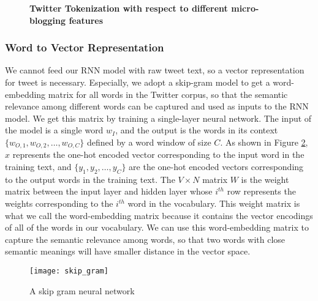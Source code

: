 \begin{figure}[ht]
\begin{minipage}[t]{1\linewidth}
\centering 
{} 
\caption{\textbf{Twitter Tokenization with respect to different micro-blogging features}}
\label{fig:token}
\end{minipage}
\end{figure}


\subsubsection {Word to Vector Representation}
We cannot feed our RNN model with raw tweet text, so a vector representation for tweet is necessary.
%
Especially, we adopt a skip-gram model to get a word-embedding matrix for all words in the Twitter corpus\cite{mikolov2013efficient}, so that the semantic relevance  among different words can be captured and used as inputs to the RNN model.
%
We get this matrix by training a single-layer neural network. 
%
 The input of the model is a single word $w_I$, and the output is the words in its context $\{w_{O,1},w_{O,2}, \dots, w_{O,C}\}$ defined by a word window of size $C$.
%
As shown in Figure \ref{fig:skip_gram},  $x$ represents the one-hot encoded vector corresponding to the
input word in the training text,
%
 and $\{y_1, y_2, \dots, y_C\}$ are the one-hot encoded vectors corresponding to the output words in the training text.
 The $V \times N$ matrix $W$ is the weight matrix between the input layer and hidden layer whose
$i^{th}$ row represents the weights corresponding to the $i^{th}$ word in the vocabulary. 
%
This weight matrix is what we call the word-embedding matrix because it contains the
vector encodings of all of the words in our vocabulary.
%
We can use this word-embedding matrix to capture the semantic relevance among words, so that two words with close semantic meanings will have smaller distance in the vector space.

\begin{figure}[htb]
	\centering
	\texttt{[image: skip\_gram]}
	\caption{A skip gram neural network}
	\label{fig:skip_gram}
\end{figure} 

